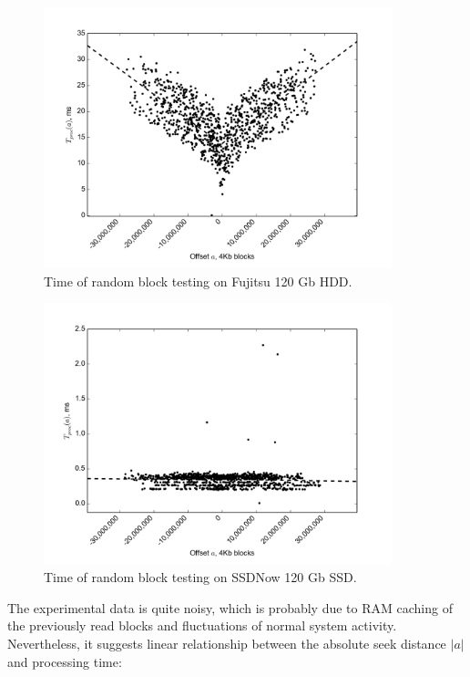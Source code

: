 \documentclass[final,5p,times,twocolumn,authoryear]{elsarticle}
\begin{document}
\begin{figure}
  \centerline{\includegraphics[width=0.9\textwidth]{seek-time-hdd}}
  \caption{Time of random block testing on Fujitsu 120 Gb HDD.}
  \label{fig:seek_time_hdd}
\end{figure}

\begin{figure}
  \centerline{\includegraphics[width=0.9\textwidth]{seek-time-ssd}}
  \caption{Time of random block testing on SSDNow 120 Gb SSD.}
  \label{fig:seek_time_ssd}
\end{figure}

The experimental data is quite noisy, which is probably due to RAM caching of the previously read blocks and fluctuations of normal system activity. Nevertheless, it suggests linear relationship between the absolute seek distance $|a|$ and processing time:
\end{document}
